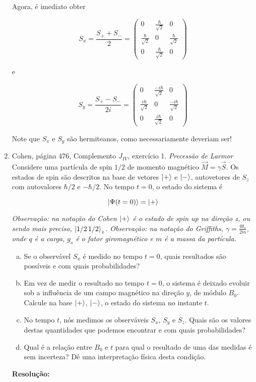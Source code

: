 \documentclass[a4paper, 12pt, notitlepage]{article}
\begin{document}
\begin{enumerate}
Agora, é imediato obter

\[
S_x = \frac{S_+ + S_-}{2} = \begin{pmatrix}
  0 & \frac{\hbar}{\sqrt{2}} & 0 \\
  \frac{\hbar}{\sqrt{2}} & 0 & \frac{\hbar}{\sqrt{2}} \\
  0 & \frac{\hbar}{\sqrt{2}} & 0
\end{pmatrix}
\]

\noindent e

\[
S_y = \frac{S_+ - S_-}{2i} = \begin{pmatrix}
  0 & \frac{-i\hbar}{\sqrt{2}} & 0 \\
  \frac{i\hbar}{\sqrt{2}} & 0 & \frac{-i\hbar}{\sqrt{2}} \\
  0 & \frac{i\hbar}{\sqrt{2}} & 0
\end{pmatrix}
\]

Note que $S_x$ e $S_y$ são hermiteanos, como necessariamente deveriam ser!


\item Cohen, página 476, Complemento $J_{IV}$, exercício 1.\newline
\textit{Precessão de Larmor}\newline
Considere uma partícula de spin $1/2$ de momento magnético $\vec{M} = \gamma \vec{S}$. Os estados de spin são descritos na base de vetores $\ket{+}$ e $\ket{-}$, autovetores de $S_z$ com autovalores $\hbar/2$ e $-\hbar/2$. No tempo $t=0$, o estado do sistema é

\begin{equation}
  \ket{\Psi(t=0)} = \ket{+}
\label{eq:psi.t0}
\end{equation}

\textit{Observação: na notação do Cohen $\ket{+}$ é o estado de spin up na direção z, ou sendo mais preciso, $\ket{1/2\,1/2}_z$.}\newline
\textit{Observação: na notação do Griffiths, $\gamma = \frac{qg_s}{2m}$, onde $q$ é a carga, $g_s$ é o fator giromagnético e $m$ é a massa da partícula.}

\begin{enumerate}[(a)]
 \item Se o observável $S_x$ é medido no tempo $t=0$, quais resultados são possíveis e com quais probabilidades?
 \item Em vez de medir o resultado no tempo $t=0$, o sistema é deixado evoluir sob a influência de um campo magnético na direção $y$, de módulo $B_0$. Calcule na base $\ket{+}$, $\ket{-}$, o estado do sistema no instante $t$.
 \item No tempo $t$, nós medimos os observáveis $S_x$, $S_y$ e $S_z$. Quais são os valores destas quantidades que podemos encontrar e com quais probabilidades?
 \item Qual é a relação entre $B_0$ e $t$ para qual o resultado de uma das medidas é sem incerteza? Dê uma interpretação física desta condição.
\end{enumerate}

\textbf{Resolução:}
  
\end{enumerate}
\end{document}
